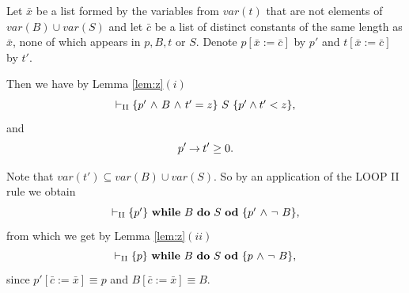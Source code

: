 \documentclass[runningheads]{llncs}       %
\begin{document}
Let $\bar{x}$ be a list formed by the variables from $var(t)$ that are
not elements of $var(B) \cup var(S)$ and let $\bar{c}$ be a list of
distinct constants of the same length as $\bar{x}$, none of which
appears in $p,B,t$ or $S$. Denote
$p[\bar{x} := \bar{c}]$ by $p'$ and $t[\bar{x} := \bar{c}]$ by $t'$.

Then we have by Lemma \ref{lem:z}$(i)$
\[
 \vdash_{\rm{II}}  \mbox{$\{{p' \mbox{$\ \wedge\ $} B \mbox{$\ \wedge\ $} t'=z}\}\ {S}\ \{{p'\wedge t'<z}\}$},         
\]
and
\[
  p' \mbox{$\:\rightarrow\:$} t' \geq 0.
\]

Note that $var(t') \subseteq var(B) \cup var(S)$. So by an application of the LOOP II rule
we obtain
\[
 \vdash_{\rm{II}}    \mbox{$\{{p'}\}\ {\mbox{$\mbox{{\bf while}\ } {B}\ \mbox{{\bf do}\ } {S}\ \mbox{{\bf od}}$}}\ \{{p' \mbox{$\ \wedge\ $} \neg\ B}\}$},
\]
from which we get by Lemma \ref{lem:z}$(ii)$
\[
 \vdash_{\rm{II}}    \mbox{$\{{p}\}\ {\mbox{$\mbox{{\bf while}\ } {B}\ \mbox{{\bf do}\ } {S}\ \mbox{{\bf od}}$}}\ \{{p \mbox{$\ \wedge\ $} \neg\ B}\}$},
\]
since $p'[\bar{c} := \bar{x}] \equiv p$ and $B[\bar{c} := \bar{x}] \equiv B$.
\HB
\VV



%
\end{document}
